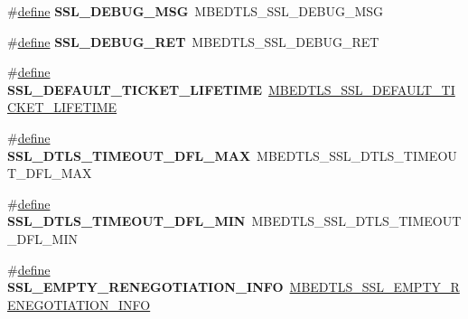 \begin{DoxyCompactItemize}
\item 
\mbox{\label{compat-1_83_8h_adc8ec84d1f22667af3102bf617b8ba03}} 
\#\hyperlink{structdefine}{define} {\bfseries S\+S\+L\+\_\+\+D\+E\+B\+U\+G\+\_\+\+M\+SG}~M\+B\+E\+D\+T\+L\+S\+\_\+\+S\+S\+L\+\_\+\+D\+E\+B\+U\+G\+\_\+\+M\+SG
\item 
\mbox{\label{compat-1_83_8h_aa48b7ffdea27ae7d7415f86f2dd275fe}} 
\#\hyperlink{structdefine}{define} {\bfseries S\+S\+L\+\_\+\+D\+E\+B\+U\+G\+\_\+\+R\+ET}~M\+B\+E\+D\+T\+L\+S\+\_\+\+S\+S\+L\+\_\+\+D\+E\+B\+U\+G\+\_\+\+R\+ET
\item 
\mbox{\label{compat-1_83_8h_a8b362b1b53efb0ad81e3183c383c9394}} 
\#\hyperlink{structdefine}{define} {\bfseries S\+S\+L\+\_\+\+D\+E\+F\+A\+U\+L\+T\+\_\+\+T\+I\+C\+K\+E\+T\+\_\+\+L\+I\+F\+E\+T\+I\+ME}~\hyperlink{ssl_8h_a893bf99106ecae0f9d9c0de2b02da6aa}{M\+B\+E\+D\+T\+L\+S\+\_\+\+S\+S\+L\+\_\+\+D\+E\+F\+A\+U\+L\+T\+\_\+\+T\+I\+C\+K\+E\+T\+\_\+\+L\+I\+F\+E\+T\+I\+ME}
\item 
\mbox{\label{compat-1_83_8h_aaa96683577b635e4de52f06a83e109a9}} 
\#\hyperlink{structdefine}{define} {\bfseries S\+S\+L\+\_\+\+D\+T\+L\+S\+\_\+\+T\+I\+M\+E\+O\+U\+T\+\_\+\+D\+F\+L\+\_\+\+M\+AX}~M\+B\+E\+D\+T\+L\+S\+\_\+\+S\+S\+L\+\_\+\+D\+T\+L\+S\+\_\+\+T\+I\+M\+E\+O\+U\+T\+\_\+\+D\+F\+L\+\_\+\+M\+AX
\item 
\mbox{\label{compat-1_83_8h_a1ebfa53698b208dddc6e20c0b5e89149}} 
\#\hyperlink{structdefine}{define} {\bfseries S\+S\+L\+\_\+\+D\+T\+L\+S\+\_\+\+T\+I\+M\+E\+O\+U\+T\+\_\+\+D\+F\+L\+\_\+\+M\+IN}~M\+B\+E\+D\+T\+L\+S\+\_\+\+S\+S\+L\+\_\+\+D\+T\+L\+S\+\_\+\+T\+I\+M\+E\+O\+U\+T\+\_\+\+D\+F\+L\+\_\+\+M\+IN
\item 
\mbox{\label{compat-1_83_8h_a61a7c669453e92d91c13e84c205e6dc2}} 
\#\hyperlink{structdefine}{define} {\bfseries S\+S\+L\+\_\+\+E\+M\+P\+T\+Y\+\_\+\+R\+E\+N\+E\+G\+O\+T\+I\+A\+T\+I\+O\+N\+\_\+\+I\+N\+FO}~\hyperlink{ssl_8h_adcfcbbd2bb1a0d4c2a9589f371fd6b83}{M\+B\+E\+D\+T\+L\+S\+\_\+\+S\+S\+L\+\_\+\+E\+M\+P\+T\+Y\+\_\+\+R\+E\+N\+E\+G\+O\+T\+I\+A\+T\+I\+O\+N\+\_\+\+I\+N\+FO}
\item 
\mbox{\label{compat-1_83_8h_a4f82efda74a681eca666ada848301665}} 

\end{DoxyCompactItemize}
